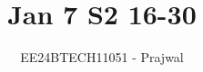 \documentclass[journal]{IEEEtran}
\begin{document}

\vspace{3cm}

\title{Jan 7 S2 16-30}
\author{EE24BTECH11051 - Prajwal}
{\let\newpage\relax\maketitle}

\renewcommand{\thefigure}{\theenumi}
\renewcommand{\thetable}{\theenumi}
\setlength{\intextsep}{10pt} %


\renewcommand{\thetable}{\theenumi}
\end{document}
